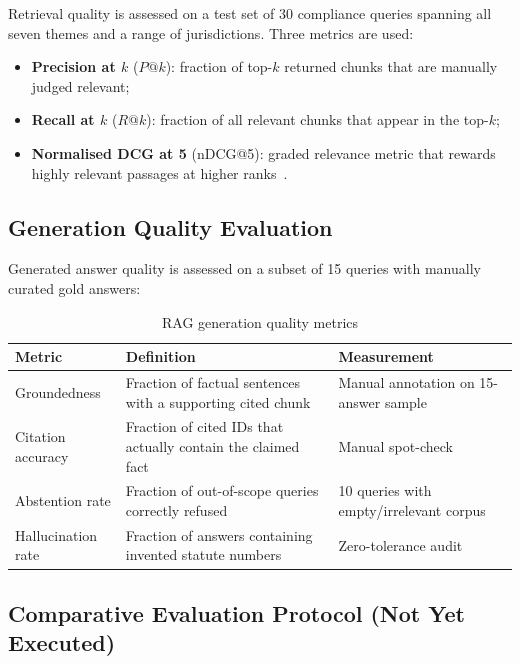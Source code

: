 Retrieval quality is assessed on a test set of 30 compliance queries spanning
all seven themes and a range of jurisdictions. Three metrics are used:

\begin{itemize}[noitemsep]
  \item \textbf{Precision at $k$} ($P@k$): fraction of top-$k$ returned chunks
        that are manually judged relevant;
  \item \textbf{Recall at $k$} ($R@k$): fraction of all relevant chunks that
        appear in the top-$k$;
  \item \textbf{Normalised DCG at 5} (nDCG@5): graded relevance metric that
        rewards highly relevant passages at higher ranks~\cite{karpukhin2020}.
\end{itemize}

\subsection{Generation Quality Evaluation}
\label{sec:rag-eval-gen}

Generated answer quality is assessed on a subset of 15 queries with manually
curated gold answers:

\begin{table}[htbp]
\centering
\caption{RAG generation quality metrics}
\label{tab:rag-gen-metrics}
\begin{tabular}{@{}p{3.0cm}p{4.0cm}p{4.5cm}@{}}
\toprule
\textbf{Metric} & \textbf{Definition} & \textbf{Measurement} \\
\midrule
Groundedness & Fraction of factual sentences with a supporting cited chunk & Manual annotation on 15-answer sample \\
Citation accuracy & Fraction of cited IDs that actually contain the claimed fact & Manual spot-check \\
Abstention rate & Fraction of out-of-scope queries correctly refused & 10 queries with empty/irrelevant corpus \\
Hallucination rate & Fraction of answers containing invented statute numbers & Zero-tolerance audit \\
\bottomrule
\end{tabular}
\end{table}

\subsection{Comparative Evaluation Protocol (Not Yet Executed)}
\label{sec:rag-eval-results}

